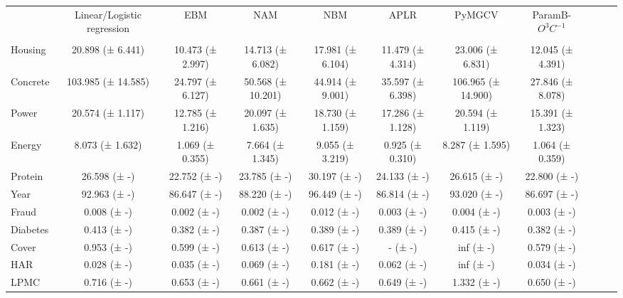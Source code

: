 \begin{tabular}{lcccccccccc}
\toprule
 & Linear/Logistic regression & EBM & NAM & NBM & APLR & PyMGCV & ParamB-$O^3C^{-1}$ \\
 &  &  &  &  &  &  &  \\
\midrule
Housing & 20.898 (± 6.441) & 10.473 (± 2.997) & 14.713 (± 6.082) & 17.981 (± 6.104) & 11.479 (± 4.314) & 23.006 (± 6.831) & 12.045 (± 4.391) \\
Concrete & 103.985 (± 14.585) & 24.797 (± 6.127) & 50.568 (± 10.201) & 44.914 (± 9.001) & 35.597 (± 6.398) & 106.965 (± 14.900) & 27.846 (± 8.078) \\
Power & 20.574 (± 1.117) & 12.785 (± 1.216) & 20.097 (± 1.635) & 18.730 (± 1.159) & 17.286 (± 1.128) & 20.594 (± 1.119) & 15.391 (± 1.323) \\
Energy & 8.073 (± 1.632) & 1.069 (± 0.355) & 7.664 (± 1.345) & 9.055 (± 3.219) & 0.925 (± 0.310) & 8.287 (± 1.595) & 1.064 (± 0.359) \\
Protein & 26.598 (± -) & 22.752 (± -) & 23.785 (± -) & 30.197 (± -) & 24.133 (± -) & 26.615 (± -) & 22.800 (± -) \\
Year & 92.963 (± -) & 86.647 (± -) & 88.220 (± -) & 96.449 (± -) & 86.814 (± -) & 93.020 (± -) & 86.697 (± -) \\
Fraud & 0.008 (± -) & 0.002 (± -) & 0.002 (± -) & 0.012 (± -) & 0.003 (± -) & 0.004 (± -) & 0.003 (± -) \\
Diabetes & 0.413 (± -) & 0.382 (± -) & 0.387 (± -) & 0.389 (± -) & 0.389 (± -) & 0.415 (± -) & 0.382 (± -) \\
Cover & 0.953 (± -) & 0.599 (± -) & 0.613 (± -) & 0.617 (± -) & - (± -) & inf (± -) & 0.579 (± -) \\
HAR & 0.028 (± -) & 0.035 (± -) & 0.069 (± -) & 0.181 (± -) & 0.062 (± -) & inf (± -) & 0.034 (± -) \\
LPMC & 0.716 (± -) & 0.653 (± -) & 0.661 (± -) & 0.662 (± -) & 0.649 (± -) & 1.332 (± -) & 0.650 (± -) \\
\bottomrule
\end{tabular}
